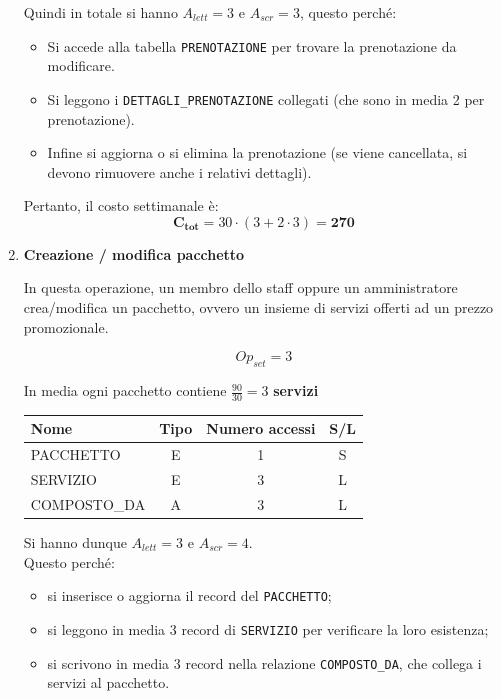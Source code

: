 \documentclass[a4paper,12pt]{report}
\begin{document}
\begin{enumerate}
    Quindi in totale si hanno $A_{lett}=3$ e $A_{scr}=3$, questo perché:
    \begin{itemize}
        \item Si accede alla tabella \texttt{PRENOTAZIONE} per trovare la prenotazione da modificare.
        \item Si leggono i \texttt{DETTAGLI\_PRENOTAZIONE} collegati (che sono in media 2 per prenotazione).
        \item Infine si aggiorna o si elimina la prenotazione (se viene cancellata, si devono rimuovere anche i relativi dettagli).
    \end{itemize}

    Pertanto, il costo settimanale è:
    $$
    \mathbf{C_{tot}} = 30 \cdot (3 + 2 \cdot 3) = \mathbf{270}
    $$

        
	\item {\large \textbf{Creazione / modifica pacchetto} \label{op5}}
    
    In questa operazione, un membro dello staff oppure un amministratore crea/modifica un pacchetto, ovvero un insieme di servizi offerti ad un prezzo promozionale.
    
    $$
    {Op}_{set}=3
    $$
    
    In media ogni pacchetto contiene $\frac{90}{30}=3$ \textbf{servizi}
    
    \begin{table}[H]
    \centering
    \small
    \renewcommand{\arraystretch}{1.15}
    \begin{tabularx}{0.8\textwidth}{|X|c|c|c|}
        \hline
        \rowcolor{gray!20}
        \textbf{Nome} & \textbf{Tipo} & \textbf{Numero accessi} & \textbf{S/L} \\
        \hline
        PACCHETTO & E & 1 & S \\
        SERVIZIO & E & 3 & L\\
        COMPOSTO\_DA & A & 3 & L \\
        \hline
    \end{tabularx}
	\end{table}
    Si hanno dunque $A_{lett}=3$ e $A_{scr}=4$. \\
    Questo perché:
	\begin{itemize}
    \item si inserisce o aggiorna il record del \texttt{PACCHETTO};
    \item si leggono in media 3 record di \texttt{SERVIZIO} per verificare la loro esistenza;
    \item si scrivono in media 3 record nella relazione \texttt{COMPOSTO\_DA}, che collega i 	servizi al pacchetto.
  \end{itemize}


\end{enumerate}
\end{document}
